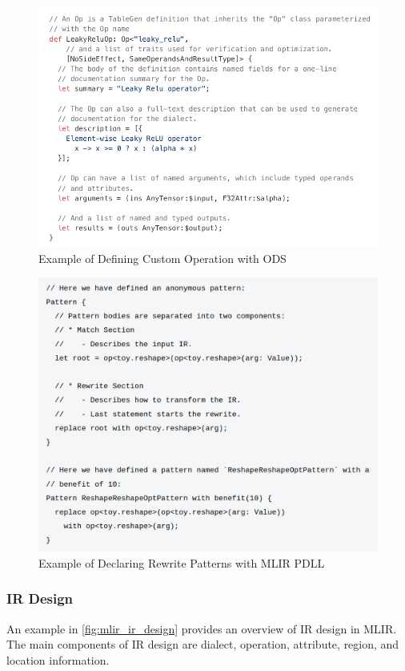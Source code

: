 \begin{figure}[ht]
    \centering
    \includegraphics[width=0.8\linewidth]{figures/MLIR_ODS.png}
    \caption{Example of Defining Custom Operation with ODS}
    \label{fig:mlir_ods}
\end{figure}

\begin{figure}[ht]
    \centering
    \includegraphics[width=0.6\linewidth]{figures/MLIR_PDLL.png}
    \caption{Example of Declaring Rewrite Patterns with MLIR PDLL}
    \label{fig:mlir_pdll}
\end{figure}


\subsubsection{IR Design}
An example in \cref{fig:mlir_ir_design} provides an overview of IR design in MLIR. The main components of IR design are dialect, operation, attribute, region, and location information.

